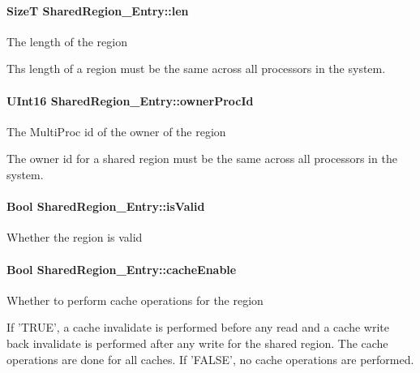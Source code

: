 \paragraph[{len}]{\setlength{\rightskip}{0pt plus 5cm}SizeT {\bf SharedRegion\_\-Entry::len}}\hfill\label{struct_shared_region___entry_ae71dcd036cf9b3dbfd8be2541322f64e}
The length of the region

Ths length of a region must be the same across all processors in the system. 
\paragraph[{ownerProcId}]{\setlength{\rightskip}{0pt plus 5cm}UInt16 {\bf SharedRegion\_\-Entry::ownerProcId}}\hfill\label{struct_shared_region___entry_a5b14dd19f62a192f1aa843063d1cbbda}
The MultiProc id of the owner of the region

The owner id for a shared region must be the same across all processors in the system. 
\paragraph[{isValid}]{\setlength{\rightskip}{0pt plus 5cm}Bool {\bf SharedRegion\_\-Entry::isValid}}\hfill\label{struct_shared_region___entry_ac2de956bb1b21e1372ba61a50c012ef5}
Whether the region is valid 
\paragraph[{cacheEnable}]{\setlength{\rightskip}{0pt plus 5cm}Bool {\bf SharedRegion\_\-Entry::cacheEnable}}\hfill\label{struct_shared_region___entry_a3aeb47b20eb18950a8ae1fb09d1ebade}
Whether to perform cache operations for the region

If 'TRUE', a cache invalidate is performed before any read and a cache write back invalidate is performed after any write for the shared region. The cache operations are done for all caches. If 'FALSE', no cache operations are performed. 
